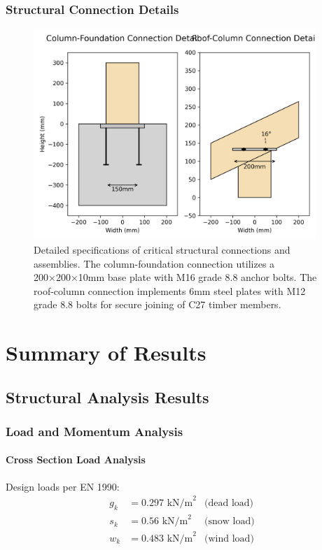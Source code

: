 \documentclass[12pt,a4paper]{article}
\begin{document}
\subsubsection{Structural Connection Details}
\begin{figure}[H]
    \centering
    \includegraphics[width=0.95\textwidth]{cad_project/enhanced_exports/screenshots/connection_details.png}
    \caption{Detailed specifications of critical structural connections and assemblies.
    The column-foundation connection utilizes a 200×200×10mm base plate with M16 grade 8.8 anchor bolts.
    The roof-column connection implements 6mm steel plates with M12 grade 8.8 bolts for secure joining of C27 timber members.}
    \label{fig:connection_details}
\end{figure}

\section{Summary of Results}
\subsection{Structural Analysis Results}
\subsubsection{Load and Momentum Analysis}
\paragraph{Cross Section Load Analysis}
Design loads per EN 1990:
\begin{equation}
\begin{aligned}
g_k &= 0.297 \text{ kN/m}^2 & \text{(dead load)} \\
s_k &= 0.56 \text{ kN/m}^2 & \text{(snow load)} \\
w_k &= 0.483 \text{ kN/m}^2 & \text{(wind load)}
\end{aligned}
\end{equation}
\end{document}
